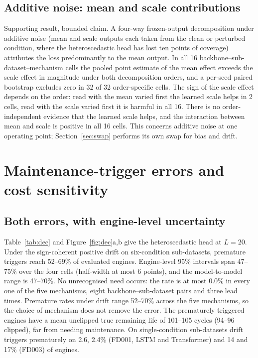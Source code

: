 \documentclass[11pt,a4paper]{article}
\newcommand{\NCITot}{32}
\newcommand{\NHelpA}{2}
\newcommand{\JDriftPremRange}{52--69}
\newcommand{\JDriftPremCI}{47--75}
\newcommand{\JDriftPremModelRange}{47--70}
\newcommand{\JDriftPremHalfCI}{6}
\newcommand{\JDriftPremAllMech}{52--70}
\newcommand{\JDriftUnrecMax}{0.0}
\newcommand{\JDriftRULunc}{101--105}
\newcommand{\JDriftRULcap}{94--96}
\newcommand{\JDriftPremSingle}{2.6, 2.4}
\newcommand{\JDriftPremSingleThree}{14 and 17}
\begin{document}
\subsection{Additive noise: mean and scale contributions}\label{sec:noise}
Supporting result, bounded claim. A four-way frozen-output decomposition under additive noise (mean and scale outputs each taken from the clean or perturbed condition, where the heteroscedastic head has lost ten points of coverage) attributes the loss predominantly to the mean output. In all 16 backbone--sub-dataset--mechanism cells the pooled point estimate of the mean effect exceeds the scale effect in magnitude under both decomposition orders, and a per-seed paired bootstrap excludes zero in \NCITot{} of 32 order-specific cells. The sign of the scale effect depends on the order: read with the mean varied first the learned scale helps in \NHelpA{} cells, read with the scale varied first it is harmful in all 16. There is no order-independent evidence that the learned scale helps, and the interaction between mean and scale is positive in all 16 cells. This concerns additive noise at one operating point; Section~\ref{sec:swap} performs its own swap for bias and drift.

\section{Maintenance-trigger errors and cost sensitivity}\label{sec:decision}
\subsection{Both errors, with engine-level uncertainty}
Table~\ref{tab:dec} and Figure~\ref{fig:dec}a,b give the heteroscedastic head at $L=20$. Under the sign-coherent positive drift on six-condition sub-datasets, premature triggers reach \JDriftPremRange\% of evaluated engines. Engine-level 95\% intervals span \JDriftPremCI\% over the four cells (half-width at most \JDriftPremHalfCI{} points), and the model-to-model range is \JDriftPremModelRange\%. No unrecognised need occurs: the rate is at most \JDriftUnrecMax\% in every one of the five mechanisms, eight backbone--sub-dataset pairs and three lead times. Premature rates under drift range \JDriftPremAllMech\% across the five mechanisms, so the choice of mechanism does not remove the error. The prematurely triggered engines have a mean unclipped true remaining life of \JDriftRULunc{} cycles (\JDriftRULcap{} clipped), far from needing maintenance. On single-condition sub-datasets drift triggers prematurely on \JDriftPremSingle\% (FD001, LSTM and Transformer) and \JDriftPremSingleThree\% (FD003) of engines.
\end{document}
